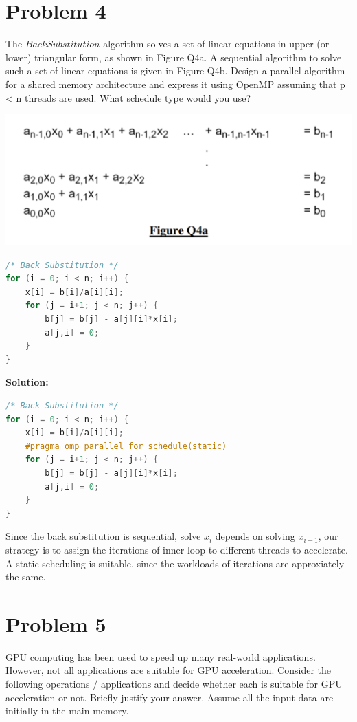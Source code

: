 \documentclass{article}
\begin{document}
\section{Problem 4}
The $Back Substitution$ algorithm solves a set of linear equations in upper (or 
lower) triangular form, as shown in Figure Q4a. A sequential algorithm to solve 
such a set of linear equations is given in Figure Q4b. Design a parallel algorithm 
for a shared memory architecture and express it using OpenMP assuming that p 
< n threads are used. What schedule type would you use?
\begin{center}
    \includegraphics[scale = 0.25]{q4.png}\\
\end{center}
\begin{lstlisting}[language=c++]
/* Back Substitution */
for (i = 0; i < n; i++) { 
    x[i] = b[i]/a[i][i]; 
    for (j = i+1; j < n; j++) { 
        b[j] = b[j] - a[j][i]*x[i]; 
        a[j,i] = 0; 
    } 
}
\end{lstlisting}
\textbf{Solution: }
\begin{lstlisting}[language=c++]
/* Back Substitution */
for (i = 0; i < n; i++) { 
    x[i] = b[i]/a[i][i];
    #pragma omp parallel for schedule(static) 
    for (j = i+1; j < n; j++) { 
        b[j] = b[j] - a[j][i]*x[i]; 
        a[j,i] = 0; 
    } 
}
\end{lstlisting}
Since the back substitution is sequential, solve $x_{i}$ depends on solving $x_{i-1}$, our strategy is to assign the iterations of inner loop to different threads to accelerate. A static scheduling is suitable, since the workloads of iterations are approxiately the same.

\pagebreak

\section{Problem 5}
GPU computing has been used to speed up many real-world applications. 
However, not all applications are suitable for GPU acceleration. Consider the 
following operations / applications and decide whether each is suitable for GPU 
acceleration or not. Briefly justify your answer. Assume all the input data are 
initially in the main memory.
\end{document}

